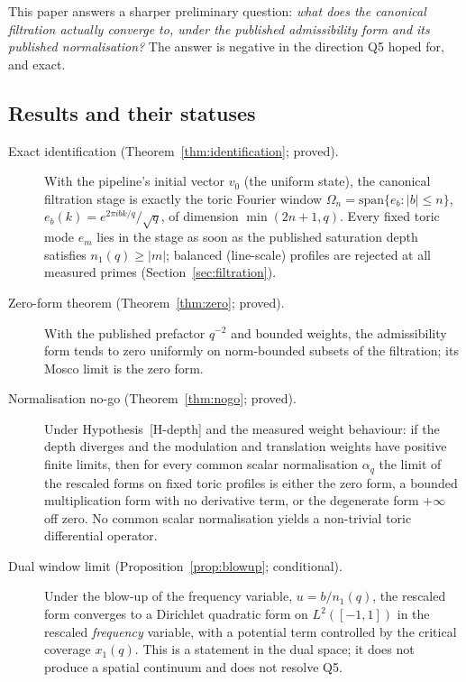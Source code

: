 \documentclass[11pt,a4paper]{article}
\theoremstyle{plain}
\theoremstyle{definition}
\theoremstyle{remark}
\begin{document}
    This paper answers a sharper preliminary question: \emph{what does the canonical filtration
    actually converge to, under the published admissibility form and its published normalisation?}
    The answer is negative in the direction Q5 hoped for, and exact.

  \subsection{Results and their statuses}

    \begin{description}
      \item[Exact identification (Theorem~\ref{thm:identification}; proved).]
      With the pipeline's initial vector $v_0$ (the uniform state), the canonical filtration stage is
      exactly the toric Fourier window
      $\Omega_n = \mathrm{span}\{e_b : |b| \le n\}$, $e_b(k) = e^{2\pi i b k/q}/\sqrt{q}$, of dimension
      $\min(2n+1, q)$.
      Every fixed toric mode $e_m$ lies in the stage as soon as the published saturation depth satisfies
      $n_1(q) \ge |m|$; balanced (line-scale) profiles are rejected at all measured primes
      (Section~\ref{sec:filtration}).

      \item[Zero-form theorem (Theorem~\ref{thm:zero}; proved).]
      With the published prefactor $q^{-2}$ and bounded weights, the admissibility form tends to zero
      uniformly on norm-bounded subsets of the filtration; its Mosco limit is the zero form.

      \item[Normalisation no-go (Theorem~\ref{thm:nogo}; proved).]
      Under Hypothesis~\textup{[H-depth]} and the measured weight behaviour:
      if the depth diverges and the modulation and translation weights have positive finite limits,
      then for every common
      scalar normalisation $\alpha_q$ the limit of the rescaled forms on fixed toric profiles is either
      the zero form, a bounded multiplication form with no derivative term, or the degenerate form
      $+\infty$ off zero.
      No common scalar normalisation yields a non-trivial toric differential operator.

      \item[Dual window limit (Proposition~\ref{prop:blowup}; conditional).]
      Under the blow-up of the frequency variable, $u = b/n_1(q)$, the rescaled form converges to
      a Dirichlet quadratic form on $L^2([-1,1])$ in the rescaled \emph{frequency} variable, with
      a potential term controlled by the critical coverage $x_1(q)$.
      This is a statement in the dual space; it does not produce a spatial continuum and does not
      resolve Q5.
    \end{description}
\end{document}
